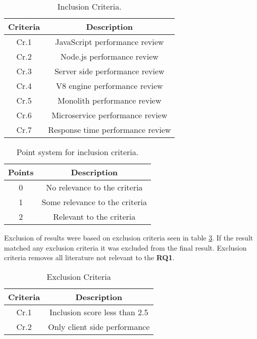 \begin{table}[h!]
    \begin{tabular}{|c c|} 
        \hline
        Criteria & Description \\ [0.5ex] 
        \hline
        Cr.1 & JavaScript performance review
        \\ 
        \hline
        Cr.2 & Node.js performance review  \\ 
        \hline
        Cr.3 & Server side performance review  \\ 
        \hline
        Cr.4 & V8 engine performance review  \\ 
        \hline
        Cr.5 & Monolith performance review  \\ 
        \hline
        Cr.6 & Microservice performance review  \\ 
        \hline
        Cr.7 & Response time performance review  \\ 
        \hline
    \end{tabular}    
    \caption{Inclusion Criteria.}
    \label{table:literature:inclusionCriteria}
\end{table}

\begin{table}[h!]
    \begin{tabular}{|c c|}
        \hline
        Points & Description \\ [0.5ex] 
        \hline
         0 & No relevance to the criteria  \\ 
        \hline
         1 & Some relevance to the criteria \\ 
        \hline
        2 & Relevant to the criteria \\ 
        \hline
    \end{tabular}
    \caption{Point system for inclusion criteria.}
    \label{table:literature:pointSystem}
\end{table}

Exclusion of results were based on exclusion criteria seen in table \ref{table:literature:exclusionCriteria}.
If the result matched any exclusion criteria it was excluded from the final result.
Exclusion criteria removes all literature not relevant to the \textbf{RQ1}.

\begin{table}[h!]
    \begin{tabular}{|c c|} 
        \hline
        Criteria & Description \\ [0.5ex] 
        \hline
        Cr.1 & Inclusion score less than 2.5 \\
        \hline
        Cr.2 & Only client side performance  \\
        \hline
    \end{tabular}    
    \caption{Exclusion Criteria}
    \label{table:literature:exclusionCriteria}
\end{table}

